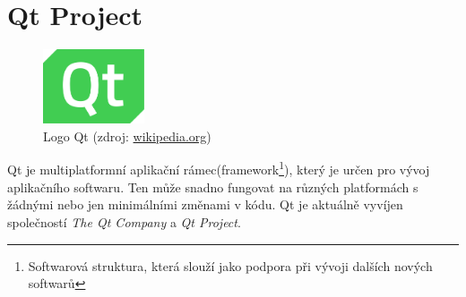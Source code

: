 \section{Qt Project}

\begin{figure}[H]
	 \centering
      \includegraphics[width=3cm]{./pictures/qt-logo.png}
      \caption{Logo Qt (zdroj:
\href{https://upload.wikimedia.org/wikipedia/commons/thumb/0/0b/Qt_logo_2016.svg/578px-Qt_logo_2016.svg.png}{wikipedia.org})}
      \label{fig:qt}
  \end{figure}
  
Qt je multiplatformní aplikační rámec(framework\footnote{Softwarová struktura, která slouží jako podpora při vývoji dalších nových softwarů}), který je určen pro vývoj aplikačního softwaru. Ten může snadno fungovat na různých platformách s žádnými nebo jen minimálními změnami v kódu. Qt je aktuálně vyvíjen společností \textit{The Qt Company} a \textit{Qt Project}.\cite{qt_wiki, qt}


